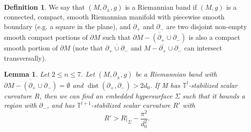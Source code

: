 \documentclass[11pt,letterpaper]{amsart}
\numberwithin{equation}{section}
\newtheorem{lemma}[theorem]{Lemma}
\theoremstyle{definition}
\newtheorem{definition}[theorem]{Definition}
\DeclareMathOperator{\dist}{dist}
\begin{document}
\begin{definition}
We say that $(M,\partial_\pm,g)$ is a Riemannian band if $(M,g)$ is a {connected, compact, smooth Riemannian manifold with piecewise smooth boundary (e.g. a square in the plane),} and $\partial_+$ and $\partial_-$ are two disjoint non-empty smooth compact portions of $\partial M$ such that $\overline{\partial M-(\partial_+\cup \partial_-)}$ is also a compact smooth portion of $\partial M$ {(note that $\overline{\partial_{+}\cup\partial_{-}}$ and $\overline{M-\partial_{+}\cup\partial_{-}}$ can intersect transversally)}.
\end{definition}
\begin{lemma}\label{Lem: smooth mu bubble}
Let $2\leq n\leq 7$. Let $(M,\partial_\pm,g)$ be a Riemannian band with $\overline{\partial M-(\partial_+\cup\partial_-)}=\emptyset$ and $\dist(\partial_+,\partial_-)> 2d_0$. If M has $\mathbb T^l$-stabilized scalar curvature $R$, then we can find an embedded hypersurface $\Sigma$ {such that it bounds a region with $\partial_-$, and} has $\mathbb T^{l+1}$-stabilized scalar curvature $R'$ with
$$
R' > R|_\Sigma-\frac{\pi^2}{d_0^2}.
$$
\end{lemma}
\end{document}
